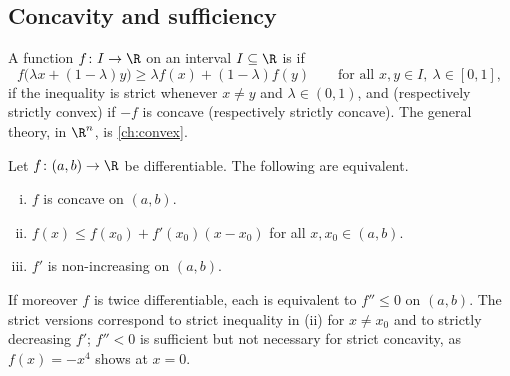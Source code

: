 \subsection{Concavity and sufficiency}

\begin{definition}\label{def:concave-1d}
	A function $f\colon I\to\R$ on an interval $I\subseteq\R$ is
	 if
	\[
		f\bigl(\lambda x+(1-\lambda)y\bigr)\geq\lambda f(x)+(1-\lambda)f(y)
		\qquad\text{for all }x,y\in I,\ \lambda\in[0,1],
	\]
	 if the inequality is strict whenever $x\neq y$ and
	$\lambda\in(0,1)$, and  (respectively strictly
	convex) if $-f$ is concave (respectively strictly concave). The general theory,
	in $\R^n$, is \autoref{ch:convex}.
\end{definition}

\begin{theorem}\label{thm:concave-tangent}
	Let $f\colon(a,b)\to\R$ be differentiable. The following are equivalent.
	\begin{enumerate}[(i)]
		\item $f$ is concave on $(a,b)$.
		\item $f(x)\leq f(x_0)+f'(x_0)(x-x_0)$ for all $x,x_0\in(a,b)$.
		\item $f'$ is non-increasing on $(a,b)$.
	\end{enumerate}
	If moreover $f$ is twice differentiable, each is equivalent to $f''\leq0$ on
	$(a,b)$. The strict versions correspond to strict inequality in (ii) for
	$x\neq x_0$ and to strictly decreasing $f'$; $f''<0$ is sufficient but not
	necessary for strict concavity, as $f(x)=-x^4$ shows at $x=0$.
\end{theorem}

